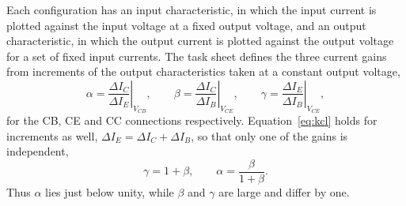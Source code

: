 \documentclass[12pt,a4paper]{article}
\begin{document}
	\newpage
	Each configuration has an input characteristic, in which the input
	current is plotted against the input voltage at a fixed output voltage,
	and an output characteristic, in which the output current is plotted
	against the output voltage for a set of fixed input currents. The task
	sheet defines the three current gains from increments of the output
	characteristics taken at a constant output voltage,
	\begin{equation}
		\alpha = \left.\frac{\Delta I_C}{\Delta I_E}\right|_{V_{CB}}, \qquad
		\beta = \left.\frac{\Delta I_C}{\Delta I_B}\right|_{V_{CE}}, \qquad
		\gamma = \left.\frac{\Delta I_E}{\Delta I_B}\right|_{V_{CE}},
		\label{eq:gains}
	\end{equation}
	for the CB, CE and CC connections respectively. Equation~\eqref{eq:kcl}
	holds for increments as well, $\Delta I_E = \Delta I_C + \Delta I_B$, so
	that only one of the gains is independent,
	\begin{equation}
		\gamma = 1 + \beta, \qquad
		\alpha = \frac{\beta}{1+\beta} .
		\label{eq:gainrel}
	\end{equation}
	Thus $\alpha$ lies just below unity, while $\beta$ and $\gamma$ are large
	and differ by one.
\end{document}
